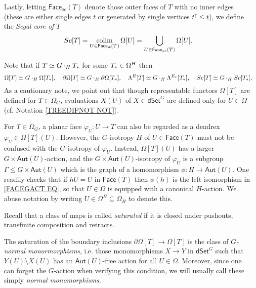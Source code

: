 \documentclass[a4paper,10pt
]{article}%
\begin{document}
Lastly, letting $\mathsf{Face}_{sc}(T)$ denote those outer faces of $T$ with no inner edges (these are either single edges $t$ or generated by single vertices $t^{\uparrow} \leq t$), we define the 
\textit{Segal core of $T$}
\[
	Sc[T] 
= 
	\mathop{\operatorname{colim}}_{U \in 
	\mathsf{Face_{sc}}(T)}
	\Omega[U] 
=
	\bigcup_{U \in 
	\mathsf{Face}_{sc}(T)}
	\Omega[U].
\]

Note that if $T \simeq G \cdot_H T_{\**}$ for some $T_{\**} \in \Omega^H$ then 
\begin{equation}\label{T_DECOMP_EQ}
	\Omega[T] \simeq G \cdot_H \Omega[T_{\**}], 
\quad
	\partial \Omega[T] \simeq G \cdot_H \partial \Omega[T_{\**}], \quad
	\Lambda^{E}[T] \simeq G \cdot_H \Lambda^{E_{\**}}[T_{\**}],
\quad
	Sc[T] \simeq G \cdot_H Sc[T_{\**}].
\end{equation}
As a cautionary note, we point out that though representable functors $\Omega[T]$ are defined for $T \in \Omega_G$,
evaluations $X(U)$ of $X \in \mathsf{dSet}^G$
are defined only for $U \in \Omega$ (cf. Notation \ref{TREEDIFNOT NOT}).

\begin{remark}\label{FACEGACT REM}
	For $T \in \Omega_G$, a planar face $\varphi_U \colon U \to T$
	can also be regarded as a dendrex $\varphi_U \in \Omega[T](U)$.
	However, the $G$-isotropy $H$ of $U \in \mathsf{Face}(T)$ must not be confused with the $G$-isotropy of $\varphi_U$.
	Instead, $\Omega[T](U)$ has a larger $G \times \mathsf{Aut}(U)$-action,
	and the $G \times \mathsf{Aut}(U)$-isotropy of $\varphi_U$
	is a subgroup 
	$\Gamma \leq G \times \mathsf{Aut}(U)$
	which is the graph of a homomorphism
	$\phi\colon H \to \mathsf{Aut}(U)$.
	One readily checks that if $hU = U$ in $\mathsf{Face}(T)$ then
	$\phi(h)$ is the left isomorphism in \eqref{FACEGACT EQ},
	so that $U\in \Omega$ is equipped with a canonical $H$-action.
	We abuse notation by writing 
	$U \in \Omega^H \subseteq \Omega_H$ to denote this.  
\end{remark}


Recall that a class of maps is called \textit{saturated} if it is closed under pushouts, transfinite composition and retracts. 

The saturation of the boundary inclusions 
$\partial \Omega[T] \to \Omega[T]$
is the class of \textit{$G$-normal monormorphisms},
i.e. those monomorphisms $X \to Y$ in $\mathsf{dSet}^G$ such that
$Y(U) \setminus X(U)$ has an $\mathsf{Aut}(U)$-free action for all $U \in \Omega$. 
Moreover, since one can forget the $G$-action when verifying this condition, we will usually call these simply \textit{normal monomorphisms}.
\end{document}

